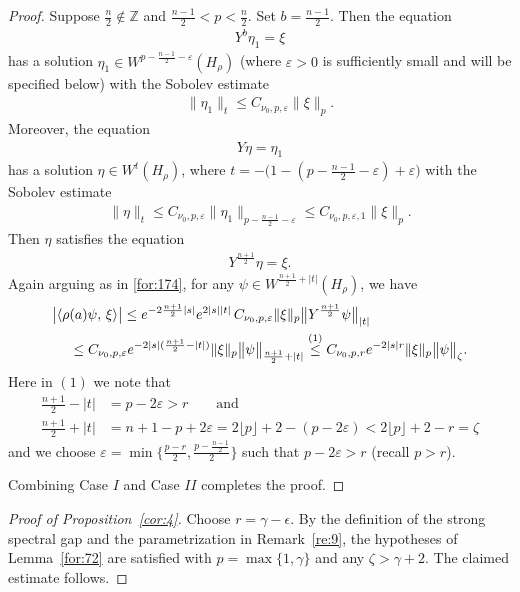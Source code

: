 \documentclass[11 pt]{amsart}
\newcommand{\ZZ}{\mathbb{Z}}
\theoremstyle{definition}
\numberwithin{equation}{section}
\begin{document}
\begin{proof}
Suppose $\frac{n}{2}\notin\ZZ$ and $\frac{n-1}{2}<p<\frac{n}{2}$.   Set $b=\frac{n-1}{2}$. Then the equation
\begin{align*}
 Y^b\eta_1=\xi
\end{align*}
has a solution $\eta_1\in W^{p-\frac{n-1}{2}-\varepsilon}(H_\rho)$ (where $\varepsilon>0$ is sufficiently small and will be specified below) with the Sobolev estimate
\begin{align}
 \|\eta_1 \|_{t} \leq C_{\nu_0,p,\varepsilon} \| \xi \|_{p}.
\end{align}
Moreover, the equation
\begin{align*}
 Y\eta=\eta_1
\end{align*}
has a solution $\eta\in W^{t}(H_\rho)$, where $t=-\big(1-(p-\frac{n-1}{2}-\varepsilon)+\varepsilon\big)$ with the Sobolev estimate
\begin{align}
 \|\eta \|_{t} \leq C_{\nu_0,p,\varepsilon} \| \eta_1 \|_{p-\frac{n-1}{2}-\varepsilon}\leq C_{\nu_0,p,\varepsilon,1} \| \xi \|_{p}.
\end{align}
Then $\eta$ satisfies the equation
\begin{align*}
 Y^\frac{n+1}{2}\eta=\xi.
\end{align*}
Again arguing as in \eqref{for:174}, for any $\psi\in W^{\frac{n+1}{2}+|t|}(H_\rho)$, we have
\begin{align*}
 \big|\langle \rho&(a)\psi,\, \xi\rangle \big|\leq e^{-2\frac{n+1}{2}|s|} e^{2|s||t|}\,C_{\nu_0,p,\varepsilon} \| \xi \|_{p} \big\|Y^\frac{n+1}{2}\psi\big\|_{|t|}\notag\\
 &\leq C_{\nu_0,p,\varepsilon} e^{-2|s|(\frac{n+1}{2}-|t|)}  \| \xi \|_{p} \big\|\psi\big\|_{\frac{n+1}{2}+|t|}\overset{\text{(1)}}{\leq} C_{\nu_0,p,r} e^{-2|s|r}  \| \xi \|_{p} \big\|\psi\big\|_{\zeta}.
\end{align*}
Here in $(1)$ we note that
\begin{align*}
 \frac{n+1}{2}-|t|&=p-2\varepsilon> r\qquad\text{and}\\
 \frac{n+1}{2}+|t|&=n+1-p+2\varepsilon=2\lfloor p\rfloor+2-(p-2\varepsilon)<2\lfloor p\rfloor+2-r=\zeta
\end{align*}
and we choose $\varepsilon=\min\{\frac{p-r}{2}, \frac{p-\frac{n-1}{2}}{2}\}$ such that $p-2\varepsilon>r$ (recall $p>r$).


Combining Case $I$ and Case $II$ completes the proof.
\end{proof}
\begin{proof}[Proof of Proposition~\ref{cor:4}]
Choose \(r=\gamma-\epsilon\). By the definition of the strong spectral gap and
the parametrization in Remark~\ref{re:9}, the hypotheses of Lemma~\ref{for:72}
are satisfied with \(p=\max\{1,\gamma\}\) and any \(\zeta>\gamma+2\). The
claimed estimate follows.
\end{proof}
\end{document}
